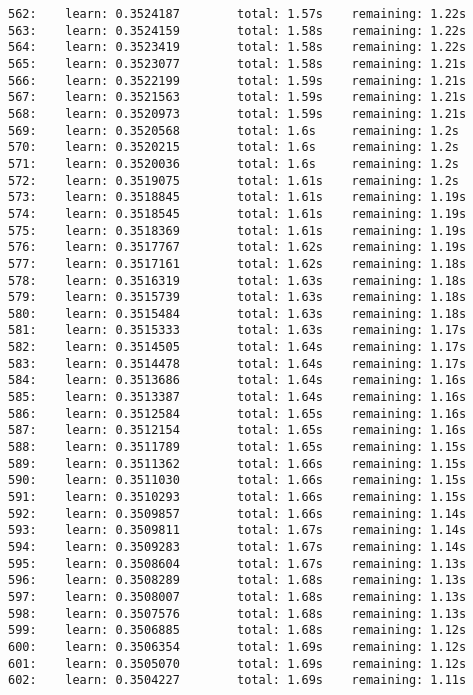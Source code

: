 \documentclass[11pt]{article}
\begin{document}
\begin{Verbatim}[commandchars=\\\{\}]
562:    learn: 0.3524187        total: 1.57s    remaining: 1.22s
563:    learn: 0.3524159        total: 1.58s    remaining: 1.22s
564:    learn: 0.3523419        total: 1.58s    remaining: 1.22s
565:    learn: 0.3523077        total: 1.58s    remaining: 1.21s
566:    learn: 0.3522199        total: 1.59s    remaining: 1.21s
567:    learn: 0.3521563        total: 1.59s    remaining: 1.21s
568:    learn: 0.3520973        total: 1.59s    remaining: 1.21s
569:    learn: 0.3520568        total: 1.6s     remaining: 1.2s
570:    learn: 0.3520215        total: 1.6s     remaining: 1.2s
571:    learn: 0.3520036        total: 1.6s     remaining: 1.2s
572:    learn: 0.3519075        total: 1.61s    remaining: 1.2s
573:    learn: 0.3518845        total: 1.61s    remaining: 1.19s
574:    learn: 0.3518545        total: 1.61s    remaining: 1.19s
575:    learn: 0.3518369        total: 1.61s    remaining: 1.19s
576:    learn: 0.3517767        total: 1.62s    remaining: 1.19s
577:    learn: 0.3517161        total: 1.62s    remaining: 1.18s
578:    learn: 0.3516319        total: 1.63s    remaining: 1.18s
579:    learn: 0.3515739        total: 1.63s    remaining: 1.18s
580:    learn: 0.3515484        total: 1.63s    remaining: 1.18s
581:    learn: 0.3515333        total: 1.63s    remaining: 1.17s
582:    learn: 0.3514505        total: 1.64s    remaining: 1.17s
583:    learn: 0.3514478        total: 1.64s    remaining: 1.17s
584:    learn: 0.3513686        total: 1.64s    remaining: 1.16s
585:    learn: 0.3513387        total: 1.64s    remaining: 1.16s
586:    learn: 0.3512584        total: 1.65s    remaining: 1.16s
587:    learn: 0.3512154        total: 1.65s    remaining: 1.16s
588:    learn: 0.3511789        total: 1.65s    remaining: 1.15s
589:    learn: 0.3511362        total: 1.66s    remaining: 1.15s
590:    learn: 0.3511030        total: 1.66s    remaining: 1.15s
591:    learn: 0.3510293        total: 1.66s    remaining: 1.15s
592:    learn: 0.3509857        total: 1.66s    remaining: 1.14s
593:    learn: 0.3509811        total: 1.67s    remaining: 1.14s
594:    learn: 0.3509283        total: 1.67s    remaining: 1.14s
595:    learn: 0.3508604        total: 1.67s    remaining: 1.13s
596:    learn: 0.3508289        total: 1.68s    remaining: 1.13s
597:    learn: 0.3508007        total: 1.68s    remaining: 1.13s
598:    learn: 0.3507576        total: 1.68s    remaining: 1.13s
599:    learn: 0.3506885        total: 1.68s    remaining: 1.12s
600:    learn: 0.3506354        total: 1.69s    remaining: 1.12s
601:    learn: 0.3505070        total: 1.69s    remaining: 1.12s
602:    learn: 0.3504227        total: 1.69s    remaining: 1.11s

\end{Verbatim}
\end{document}
